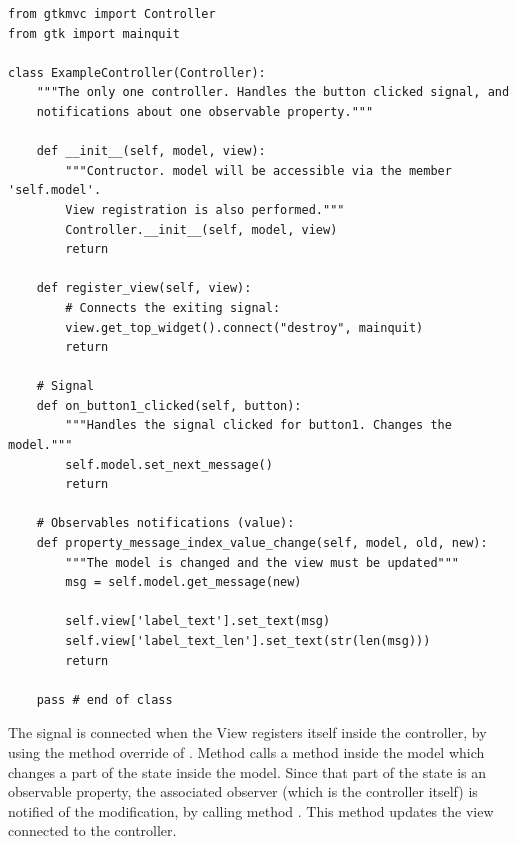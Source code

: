 { \codesize 
\begin{verbatim} 
from gtkmvc import Controller
from gtk import mainquit

class ExampleController(Controller):
    """The only one controller. Handles the button clicked signal, and
    notifications about one observable property."""

    def __init__(self, model, view):
        """Contructor. model will be accessible via the member 'self.model'.
        View registration is also performed."""
        Controller.__init__(self, model, view)
        return

    def register_view(self, view):
        # Connects the exiting signal:
        view.get_top_widget().connect("destroy", mainquit)
        return

    # Signal
    def on_button1_clicked(self, button):
        """Handles the signal clicked for button1. Changes the model."""
        self.model.set_next_message()
        return

    # Observables notifications (value):
    def property_message_index_value_change(self, model, old, new):
        """The model is changed and the view must be updated"""
        msg = self.model.get_message(new)
        
        self.view['label_text'].set_text(msg)
        self.view['label_text_len'].set_text(str(len(msg)))
        return    

    pass # end of class
\end{verbatim}
}

The  signal is connected when the View registers
itself inside the controller, by using the method override of
.  Method 
calls a method inside the model which changes a part of the state
inside the model. Since that part of the state is an observable
property, the associated observer (which is the controller itself) is
notified of the modification, by calling method
. This method
updates the view connected to the controller.

